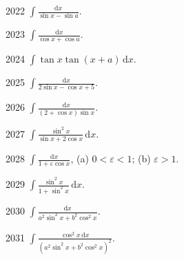 \begin{prob}[S]{2022}
$\int \frac{\mathrm{d}x}{\sin x - \sin a}$.
\end{prob}

\begin{prob}[S]{2023}
$\int \frac{\mathrm{d}x}{\cos x + \cos a}$.
\end{prob}

\begin{prob}[S]{2024}
$\int \tan x \tan(x + a) \,\mathrm{d}x$.
\end{prob}


\begin{prob}[S]{2025}
$\int \frac{\mathrm{d}x}{2\sin x - \cos x + 5}$.
\end{prob}

\begin{prob}[S]{2026}
$\int \frac{\mathrm{d}x}{(2 + \cos x)\sin x}$.
\end{prob}

\begin{prob}[S]{2027}
$\int \frac{\sin^2 x}{\sin x + 2\cos x}\,\mathrm{d}x$.
\end{prob}

\begin{prob}[M]{2028}
$\int \frac{\mathrm{d}x}{1 + \varepsilon \cos x}$, \quad (a) $0 < \varepsilon < 1$; \qquad (b) $\varepsilon > 1$.
\end{prob}

\begin{prob}[S]{2029}
$\int \frac{\sin^2 x}{1 + \sin^2 x}\,\mathrm{d}x$.
\end{prob}

\begin{prob}[S]{2030}
$\int \frac{\mathrm{d}x}{a^2 \sin^2 x + b^2 \cos^2 x}$.
\end{prob}

\begin{prob}[S]{2031}
$\int \frac{\cos^2 x \,\mathrm{d}x}{(a^2 \sin^2 x + b^2 \cos^2 x)^2}$.
\end{prob}

